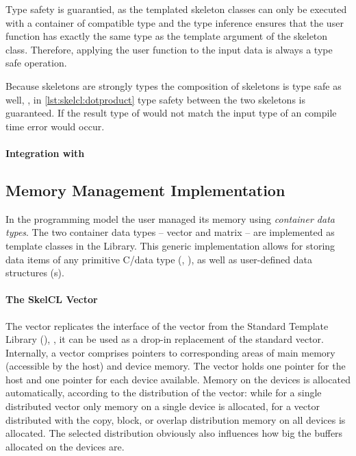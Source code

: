 Type safety is guarantied, as the templated skeleton classes can only be executed with a container of compatible type and the type inference ensures that the user function has exactly the same type as the template argument of the skeleton class.
Therefore, applying the user function to the input data is always a type safe operation.

Because skeletons are strongly types the composition of skeletons is type safe as well, \ie, in \autoref{lst:skelcl:dotproduct} type safety between the two skeletons is guaranteed.
If the result type of  would not match the input type of  an compile time error would occur.

\paragraph{Integration with \Cpp}


\subsection{Memory Management Implementation}
\label{section:skelcl-library:memory-management}
In the \SkelCL programming model the user managed its memory using \emph{container data types}.
The two container data types -- vector and matrix -- are implemented as template classes in the \SkelCL Library.
This generic implementation allows for storing data items of any primitive C/\Cpp data type (\eg, ), as well as user-defined data structures (s).

\paragraph{The SkelCL Vector}
The \SkelCL vector replicates the interface of the vector from the Standard Template Library (\STL), \ie, it can be used as a drop-in replacement of the standard vector.
Internally, a vector comprises pointers to corresponding areas of main memory (accessible by the host) and device memory.
The vector holds one pointer for the host and one pointer for each device available.
Memory on the devices is allocated automatically, according to the distribution of the vector:
while for a single distributed vector only memory on a single device is allocated, for a vector distributed with the copy, block, or overlap distribution memory on all devices is allocated.
The selected distribution obviously also influences how big the buffers allocated on the devices are.

